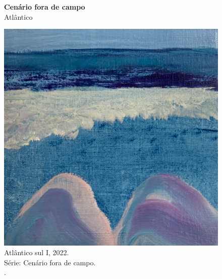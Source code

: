 \vfill

\clearpage

\begin{figure}[t]
  \caption[Cenário fora de campo: Atlântico]{\textbf{Cenário fora de campo} \\ Atlântico}
  \begin{minipage}[b]{.3\linewidth}
	\includegraphics[width = \linewidth]{apendice/pinturas-finalizadas/boudet-atlantico-sul-i.pdf}
  \caption*{Atlântico sul I, 2022. \\ Série: Cenário fora de campo. \\ \oleolinho. \\ }


\end{minipage}
\end{figure}
